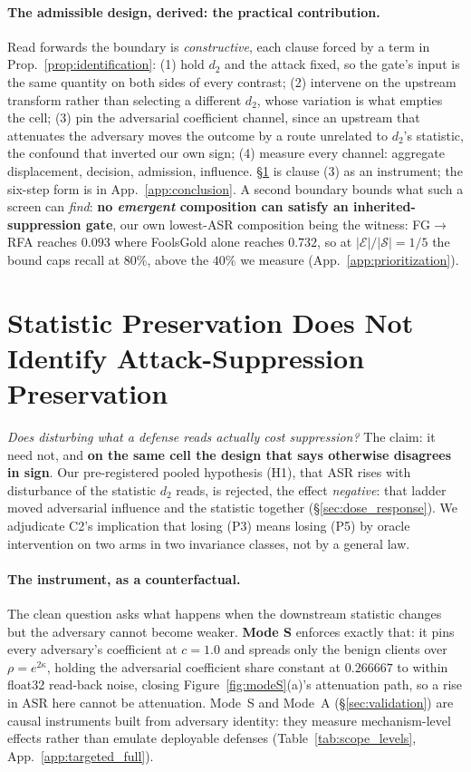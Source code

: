 \documentclass{article}
\begin{document}
\paragraph{The admissible design, derived: the practical contribution.} Read forwards the boundary is \emph{constructive}, each clause forced by a term in Prop.~\ref{prop:identification}: (1) hold $d_2$ and the attack fixed, so the gate's input is the same quantity on both sides of every contrast; (2) intervene on the upstream transform rather than selecting a different $d_2$, whose variation is what empties the cell; (3) pin the adversarial coefficient channel, since an upstream that attenuates the adversary moves the outcome by a route unrelated to $d_2$'s statistic, the confound that inverted our own sign; (4) measure every channel: aggregate displacement, decision, admission, influence. \S\ref{sec:targeted} is clause (3) as an instrument; the six-step form is in App.~\ref{app:conclusion}. A second boundary bounds what such a screen can \emph{find}: \textbf{no \emph{emergent} composition can satisfy an inherited-suppression gate}, our own lowest-ASR composition being the witness: FG$\to$RFA reaches $0.093$ where FoolsGold alone reaches $0.732$, so at $|\mathcal{E}|/|\mathcal{S}|{=}1/5$ the bound caps recall at $80\%$, above the $40\%$ we measure (App.~\ref{app:prioritization}).
\label{sec:prioritization}

\section{Statistic Preservation Does Not Identify Attack-Suppression Preservation}
\label{sec:targeted}

\emph{Does disturbing what a defense reads actually cost suppression?} The claim: it need not, and \textbf{on the same cell the design that says otherwise disagrees in sign}. Our pre-registered pooled hypothesis (H1), that ASR rises with disturbance of the statistic $d_2$ reads, is rejected, the effect \emph{negative}: that ladder moved adversarial influence and the statistic together (\S\ref{sec:dose_response}). We adjudicate C2's implication that losing (P3) means losing (P5) by oracle intervention on two arms in two invariance classes, not by a general law.

\paragraph{The instrument, as a counterfactual.} The clean question asks what happens when the downstream statistic changes but the adversary cannot become weaker. \textbf{Mode S} enforces exactly that: it pins every adversary's coefficient at $c{=}1.0$ and spreads only the benign clients over $\rho = e^{2\kappa}$, holding the adversarial coefficient share constant at $0.266667$ to within float32 read-back noise, closing Figure~\ref{fig:modeS}(a)'s attenuation path, so a rise in ASR here cannot be attenuation. Mode~S and Mode~A (\S\ref{sec:validation}) are causal instruments built from adversary identity: they measure mechanism-level effects rather than emulate deployable defenses (Table~\ref{tab:scope_levels}, App.~\ref{app:targeted_full}).
\end{document}
